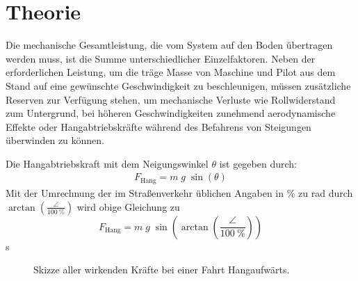 \chapter{Theorie}\label{sec:theory}
	Die mechanische Gesamtleistung, die vom System auf den Boden übertragen werden muss, ist die Summe unterschiedlicher Einzelfaktoren.
	Neben der erforderlichen Leistung, um die träge Masse von Maschine und Pilot aus dem Stand auf eine gewünschte Geschwindigkeit zu beschleunigen, müssen zusätzliche Reserven zur Verfügung stehen, um mechanische Verluste wie Rollwiderstand zum Untergrund, bei höheren Geschwindigkeiten zunehmend aerodynamische Effekte oder Hangabtriebskräfte während des Befahrens von Steigungen überwinden zu können.\par\medskip
	Die Hangabtriebskraft mit dem Neigungswinkel \(\theta\) ist gegeben durch:
	\begin{align}
		F_\text{Hang} = m \; g \; \sin\!\left(\theta\right)
		\label{eq:downhill force}
	\end{align}
	Mit der Umrechnung der im Straßenverkehr üblichen Angaben in \unit{\percent} zu \unit{\radian} durch \(\arctan\!\left(\frac{\angle}{\qty{100}{\percent}}\right)\) wird obige Gleichung zu
	\begin{equation}
		F_\text{Hang} = m \; g \; \sin\!\left(\arctan\!\left(\frac{\angle}{\qty{100}{\percent}}\right)\right)
		\label{eq:downhill force incline to radian}
	\end{equation}s
	\begin{figure}[h]
		\centering
		
		\caption[Skizze aller wirkenden Kräfte bei einer Fahrt Hangaufwärts]{Skizze aller wirkenden Kräfte bei einer Fahrt Hangaufwärts.}%
		\label{fig:sketch torque incline}
	\end{figure}


